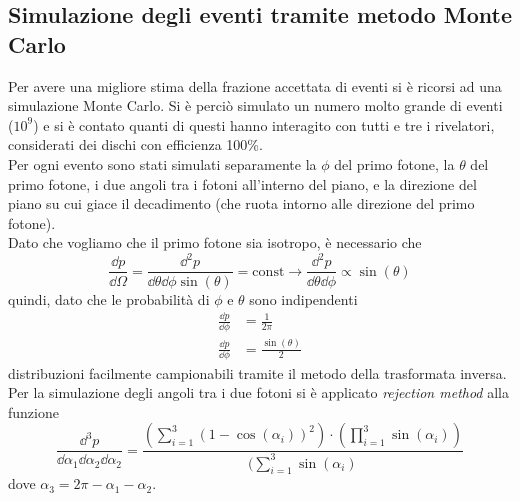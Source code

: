 \subsection{Simulazione degli eventi tramite metodo Monte Carlo}

Per avere una migliore stima della frazione accettata di eventi si è ricorsi ad una simulazione Monte Carlo. Si è perciò simulato un numero molto grande di eventi ($10^9$) e si è contato quanti di questi hanno interagito con tutti e tre i rivelatori, considerati dei dischi con efficienza 100\%.\\

Per ogni evento sono stati simulati separamente la $\phi$ del primo fotone, la $\theta$ del primo fotone, i due angoli tra i fotoni all'interno del piano, e la direzione del piano su cui giace il decadimento (che ruota intorno alle direzione del primo fotone).\\

Dato che vogliamo che il primo fotone sia isotropo, è necessario che 
\begin{equation}
	\frac{\dd p}{\dd\Omega} = \frac{\dd^2 p}{\dd\theta \dd\phi \sin(\theta)} = \mathrm{const} \rightarrow \frac{\dd^2 p}{\dd\theta \dd\phi} \propto \sin(\theta)
\end{equation}
quindi, dato che le probabilità di $\phi$ e $\theta$ sono indipendenti
\begin{align}
	\frac{\dd p}{\dd\phi}& = \frac{1}{2\pi} \label{eq:phi}\\
	\frac{\dd p}{\dd\phi}& = \frac{\sin(\theta)}{2} \label{eq:theta}
\end{align}
distribuzioni facilmente campionabili tramite il metodo della trasformata inversa.\\

Per la simulazione degli angoli tra i due fotoni si è applicato \textit{rejection method} alla funzione
\begin{equation}
	\frac{\dd^3 p}{\dd\alpha_1 \dd\alpha_2 \dd\alpha_2} = \frac{\left(\sum_{i=1}^{3} \left(1-\cos(\alpha_i)\right)^2\right)\cdot\left(\prod_{i=1}^{3} \sin(\alpha_i)\right)}{(\sum_{i=1}^{3} \sin(\alpha_i)}
\end{equation}
dove $\alpha_3=2\pi-\alpha_1-\alpha_2$.\\

